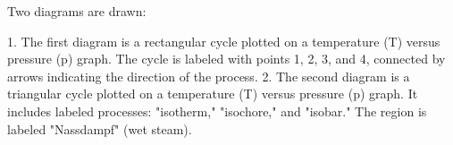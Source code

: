 Two diagrams are drawn:  

1. The first diagram is a rectangular cycle plotted on a temperature (T) versus pressure (p) graph. The cycle is labeled with points 1, 2, 3, and 4, connected by arrows indicating the direction of the process.  
2. The second diagram is a triangular cycle plotted on a temperature (T) versus pressure (p) graph. It includes labeled processes: "isotherm," "isochore," and "isobar." The region is labeled "Nassdampf" (wet steam).